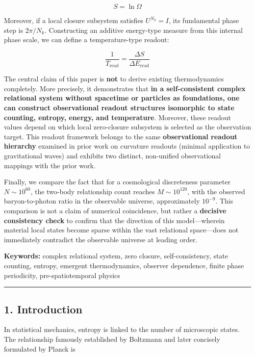 \documentclass[
  a4paper,
]{article}
\begin{document}
\[
S=\ln\Omega
\]

Moreover, if a local closure subsystem satisfies \(U^{N_k}=I\), its
fundamental phase step is \(2\pi/N_k\). Constructing an additive
energy-type measure from this internal phase scale, we can define a
temperature-type readout:

\[
\frac{1}{T_{\mathrm{read}}}
=
\frac{\Delta S}{\Delta E_{\mathrm{read}}}
\]

The central claim of this paper is \textbf{not} to derive existing
thermodynamics completely. More precisely, it demonstrates that
\textbf{in a self-consistent complex relational system without spacetime
or particles as foundations, one can construct observational readout
structures isomorphic to state counting, entropy, energy, and
temperature}. Moreover, these readout values depend on which local
zero-closure subsystem is selected as the observation target. This
readout framework belongs to the same \textbf{observational readout
hierarchy} examined in prior work on curvature readouts (minimal
application to gravitational waves) and exhibits two distinct,
non-unified observational mappings with the prior work.

Finally, we compare the fact that for a cosmological discreteness
parameter \(N\sim10^{60}\), the two-body relationship count reaches
\(M\sim10^{120}\), with the observed baryon-to-photon ratio in the
observable universe, approximately \(10^{-9}\). This comparison is not a
claim of numerical coincidence, but rather a \textbf{decisive
consistency check} to confirm that the direction of this model---wherein
material local states become sparse within the vast relational
space---does not immediately contradict the observable universe at
leading order.

\textbf{Keywords:} complex relational system, zero closure,
self-consistency, state counting, entropy, emergent thermodynamics,
observer dependence, finite phase periodicity, pre-spatiotemporal
physics

\begin{center}\rule{0.5\linewidth}{0.5pt}\end{center}

\subsection{1. Introduction}\label{introduction}

In statistical mechanics, entropy is linked to the number of microscopic
states. The relationship famously established by Boltzmann and later
concisely formulated by Planck is
\end{document}
